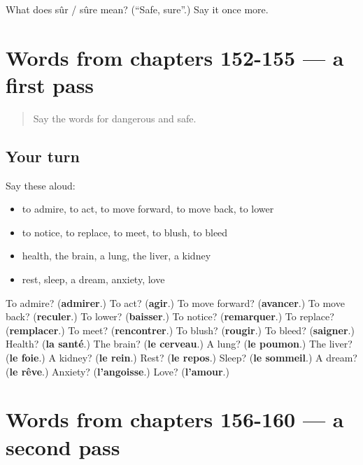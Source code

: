 \begin{tcolorbox}[breakable,colback=teal!4,colframe=teal!35!black,title={Before you move on}]
What does sûr / sûre mean? (\textquotedblleft{}Safe, sure\textquotedblright{}.) Say it once more.
\end{tcolorbox}
\section[(dialogue)]{Words from chapters 152-155 — a first pass}

\label{lesson:FR-R160-first-pass-words-from-chapters-152-155}



\begin{quote}
Say the words for dangerous and safe.
\end{quote}

\subsection*{Your turn}
Say these aloud:

\begin{itemize}
\raggedright
  \item to admire, to act, to move forward, to move back, to lower
  \item to notice, to replace, to meet, to blush, to bleed
  \item health, the brain, a lung, the liver, a kidney
  \item rest, sleep, a dream, anxiety, love
\end{itemize}

\begin{tcolorbox}[breakable,colback=teal!4,colframe=teal!35!black,title={Before you move on}]
To admire? (\textbf{admirer}.) To act? (\textbf{agir}.) To move forward? (\textbf{avancer}.) To move back? (\textbf{reculer}.) To lower? (\textbf{baisser}.) To notice? (\textbf{remarquer}.) To replace? (\textbf{remplacer}.) To meet? (\textbf{rencontrer}.) To blush? (\textbf{rougir}.) To bleed? (\textbf{saigner}.) Health? (\textbf{la santé}.) The brain? (\textbf{le cerveau}.) A lung? (\textbf{le poumon}.) The liver? (\textbf{le foie}.) A kidney? (\textbf{le rein}.) Rest? (\textbf{le repos}.) Sleep? (\textbf{le sommeil}.) A dream? (\textbf{le rêve}.) Anxiety? (\textbf{l'angoisse}.) Love? (\textbf{l'amour}.)
\end{tcolorbox}
\section[(dialogue)]{Words from chapters 156-160 — a second pass}

